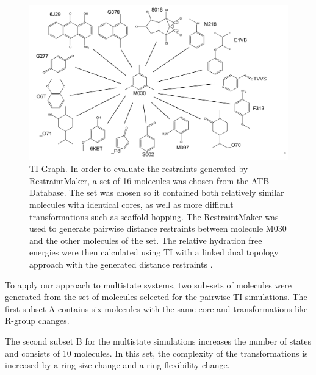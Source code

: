\begin{figure}[h]
    \centering
    \includegraphics[width=\textwidth]{fig/methods/StateGraph_TI_2D.png}
    \caption{TI-Graph. In order to evaluate the restraints generated by RestraintMaker, a set of 16 molecules was chosen from the ATB Database.\cite{Martin2018} The set was chosen so it contained both relatively similar molecules with identical cores, as well as more difficult transformations such as scaffold hopping. The RestraintMaker was used to generate pairwise distance restraints between molecule M030 and the other molecules of the set. The relative hydration free energies were then calculated using TI with a linked dual topology approach with the generated distance restraints .}
    \label{fig: Pairwise_TI_M030_Graph}
\end{figure}

To apply our approach to multistate systems, two sub-sets of molecules were generated from the set of molecules selected for the pairwise TI simulations. The first subset A contains six molecules with the same core and transformations like R-group changes.

The second subset B for the multistate simulations increases the number of states and consists of 10 molecules. In this set, the complexity of the transformations is increased by a ring size change and a ring flexibility change.

